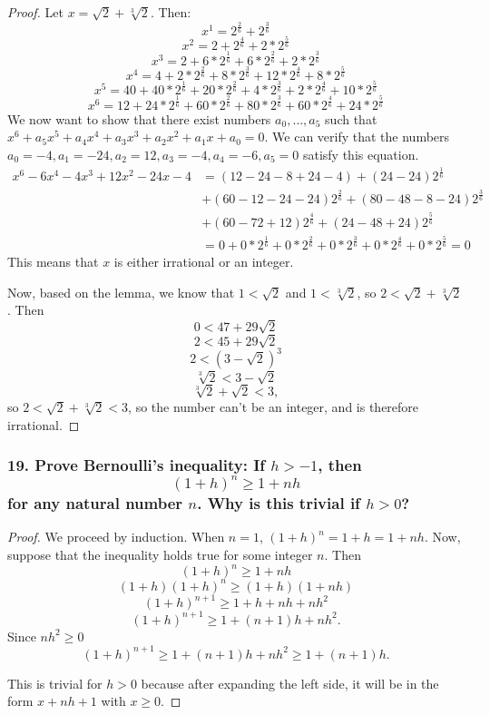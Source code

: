 \documentclass{article}
\begin{document}
\begin{enumerate}
	\begin{proof}
		Let $x = \sqrt{2} + \sqrt[3]{2}$. Then:
			\[x^1 = 2^{\frac{2}{6}} + 2^{\frac{3}{6}}\]
			\[x^2 = 2 + 2^{\frac{4}{6}} + 2*2^{\frac{5}{6}}\]
			\[x^3 = 2 + 6*2^{\frac{1}{6}} + 6*2^{\frac{2}{6}} + 2*2^{\frac{3}{6}}\]
			\[x^4 = 4 + 2*2^{\frac{2}{6}} + 8*2^{\frac{3}{6}} + 12*2^{\frac{4}{6}} + 8*2^{\frac{5}{6}}\]
			\[x^5 = 40 + 40*2^{\frac{1}{6}} + 20*2^{\frac{2}{6}} + 4*2^{\frac{3}{6}} + 2*2^{\frac{4}{6}} + 10*2^{\frac{5}{6}}\]
			\[x^6 = 12 + 24*2^{\frac{1}{6}} + 60*2^{\frac{2}{6}} + 80*2^{\frac{3}{6}} + 60*2^{\frac{4}{6}} + 24*2^{\frac{5}{6}}\]
		We now want to show that there exist numbers $a_0, \dots, a_5$ such that $x^6 + a_5x^5 + a_4x^4 + a_3x^3 + a_2x^2 + a_1x + a_0 = 0$. We can verify that the numbers $a_0=-4, a_1=-24, a_2=12, a_3=-4, a_4=-6, a_5=0$ satisfy this equation.
		\begin{align*}
			x^6 - 6x^4 -4x^3 + 12x^2 -24x - 4 &= (12-24-8+24-4) + (24-24)2^{\frac{1}{6}} \\&+ (60-12-24-24)2^{\frac{2}{6}} + (80-48-8-24)2^{\frac{3}{6}} \\&+ (60-72+12)2^{\frac{4}{6}} + (24-48+24)2^{\frac{5}{6}} \\&= 0 + 0*2^{\frac{1}{6}}+ 0*2^{\frac{2}{6}}+ 0*2^{\frac{3}{6}}+ 0*2^{\frac{4}{6}}+ 0*2^{\frac{5}{6}} = 0
		\end{align*}
		This means that $x$ is either irrational or an integer.
		
		Now, based on the lemma, we know that $1 < \sqrt{2}$ and $1 < \sqrt[3]{2}$, so $2 < \sqrt{2} + \sqrt[3]{2}$. Then
		\[0 < 47 + 29\sqrt{2}\]
		\[2 < 45 + 29\sqrt{2}\]
		\[2 < (3-\sqrt{2})^3\]
		\[\sqrt[3]{2} < 3 - \sqrt{2}\]
		\[\sqrt[3]{2} + \sqrt{2} < 3,\]
		so $2 < \sqrt{2} + \sqrt[3]{2} < 3$, so the number can't be an integer, and is therefore irrational.
	\end{proof}
\end{enumerate}

\subsubsection*{19. Prove Bernoulli's inequality: If $h > -1$, then \[(1 + h)^n \ge 1 + nh \] for any natural number $n$. Why is this trivial if $h > 0$?}

\begin{proof}
	We proceed by induction. When $n = 1$, $(1 + h)^n = 1 + h = 1 + nh$. Now, suppose that the inequality holds true for some integer $n$. Then
	\[(1 + h)^n \ge 1 + nh\]
	\[(1+h)(1 + h)^n \ge (1 + h)(1 + nh)\]
	\[(1 + h)^{n+1} \ge 1 + h + nh + nh^2\]
	\[(1 + h)^{n+1} \ge 1 + (n + 1)h + nh^2.\]
	Since $nh^2 \ge 0$
	\[(1 + h)^{n+1} \ge 1 + (n + 1)h + nh^2 \ge 1 + (n+1)h.\]

	This is trivial for $h > 0$ because after expanding the left side, it will be in the form $x + nh + 1$ with $x \ge 0$.
\end{proof}
\end{document}
